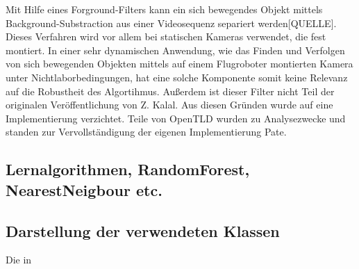 Mit Hilfe eines Forground-Filters kann ein sich bewegendes Objekt mittels Background-Substraction aus einer Videosequenz separiert werden{[}QUELLE{]}. Dieses Verfahren wird vor allem bei statischen Kameras verwendet, die fest montiert. In einer sehr dynamischen Anwendung, wie das Finden und Verfolgen von sich bewegenden Objekten mittels auf einem Flugroboter montierten Kamera unter Nichtlaborbedingungen, hat eine solche Komponente somit keine Relevanz auf die Robustheit des Algortihmus. Außerdem ist dieser Filter nicht Teil der originalen Veröffentlichung von Z. Kalal. Aus diesen Gründen wurde auf eine Implementierung verzichtet. Teile von OpenTLD wurden zu Analysezwecke und standen zur Vervollständigung der eigenen Implementierung Pate.

\subsection*{Lernalgorithmen, RandomForest, NearestNeigbour etc.}

\subsection*{Darstellung der verwendeten Klassen}
Die in 